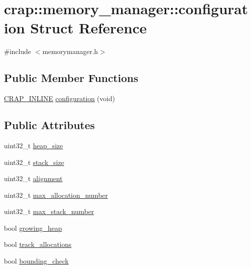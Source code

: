 \hypertarget{structcrap_1_1memory__manager_1_1configuration}{}\section{crap\+:\+:memory\+\_\+manager\+:\+:configuration Struct Reference}
\label{structcrap_1_1memory__manager_1_1configuration}


{\ttfamily \#include $<$memorymanager.\+h$>$}

\subsection*{Public Member Functions}
\begin{DoxyCompactItemize}
\item 
\hyperlink{config__x86_8h_a5a40526b8d842e7ff731509998bb0f1c}{C\+R\+A\+P\+\_\+\+I\+N\+L\+I\+N\+E} \hyperlink{structcrap_1_1memory__manager_1_1configuration_a2fcb5bff5a3fbed1dc8a653fbbf1e035}{configuration} (void)
\end{DoxyCompactItemize}
\subsection*{Public Attributes}
\begin{DoxyCompactItemize}
\item 
uint32\+\_\+t \hyperlink{structcrap_1_1memory__manager_1_1configuration_aa7b7dd302d12394b4933cd10c19b9bb3}{heap\+\_\+size}
\item 
uint32\+\_\+t \hyperlink{structcrap_1_1memory__manager_1_1configuration_ab2398e2eef2484e19c711e4a5afade26}{stack\+\_\+size}
\item 
uint32\+\_\+t \hyperlink{structcrap_1_1memory__manager_1_1configuration_a4e2eb1caa57526730fc6aed395b9d13d}{alignment}
\item 
uint32\+\_\+t \hyperlink{structcrap_1_1memory__manager_1_1configuration_a793bafe39295d86d3dda7b2406678ee2}{max\+\_\+allocation\+\_\+number}
\item 
uint32\+\_\+t \hyperlink{structcrap_1_1memory__manager_1_1configuration_ae29f9aa318e67c99b5a8a008b9971fcd}{max\+\_\+stack\+\_\+number}
\item 
bool \hyperlink{structcrap_1_1memory__manager_1_1configuration_a942e759edcd1129f4571691e87172f8f}{growing\+\_\+heap}
\item 
bool \hyperlink{structcrap_1_1memory__manager_1_1configuration_a1e65aab18541fd1200bc32e344de79f7}{track\+\_\+allocations}
\item 
bool \hyperlink{structcrap_1_1memory__manager_1_1configuration_a08b165edae1810bab7f671cf90ee1c1a}{bounding\+\_\+check}
\end{DoxyCompactItemize}


